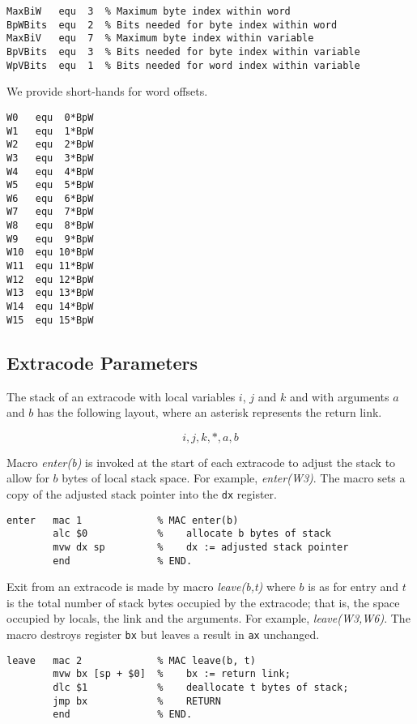 {\small
\begin{verbatim}
MaxBiW   equ  3  % Maximum byte index within word
BpWBits  equ  2  % Bits needed for byte index within word 
MaxBiV   equ  7  % Maximum byte index within variable
BpVBits  equ  3  % Bits needed for byte index within variable
WpVBits  equ  1  % Bits needed for word index within variable
\end{verbatim}}

We provide short-hands for word offsets.

{\small
\begin{verbatim}
W0   equ  0*BpW
W1   equ  1*BpW
W2   equ  2*BpW
W3   equ  3*BpW
W4   equ  4*BpW
W5   equ  5*BpW
W6   equ  6*BpW
W7   equ  7*BpW
W8   equ  8*BpW
W9   equ  9*BpW
W10  equ 10*BpW
W11  equ 11*BpW
W12  equ 12*BpW
W13  equ 13*BpW
W14  equ 14*BpW
W15  equ 15*BpW
\end{verbatim}}



\subsection{Extracode Parameters}
The stack of an extracode with local variables $i$, $j$ and $k$ and with arguments $a$ and $b$ has the following layout, where an asterisk represents the return link.

$$i,  j,  k, *,  a,  b$$

Macro \emph{enter(b)} is invoked at the start of each extracode to adjust the stack to allow for $b$ bytes of local stack space. For example, \emph{enter(W3)}.
The macro sets a copy of the adjusted stack pointer into the \texttt{dx} register.

{\small
\begin{verbatim}
enter   mac 1             % MAC enter(b)
        alc $0            %    allocate b bytes of stack
        mvw dx sp         %    dx := adjusted stack pointer
        end               % END.
\end{verbatim}}

Exit from an extracode is made by macro \emph{leave(b,t)} where $b$ is as for entry and $t$ is the total number of stack bytes occupied by the extracode; that is, the space occupied by locals, the link and the arguments. For example, \emph{leave(W3,W6)}. The macro destroys register \texttt{bx} but leaves a result in \texttt{ax} unchanged.

{\small
\begin{verbatim}
leave   mac 2             % MAC leave(b, t)
        mvw bx [sp + $0]  %    bx := return link;
        dlc $1            %    deallocate t bytes of stack;
        jmp bx            %    RETURN
        end               % END.
\end{verbatim}}



